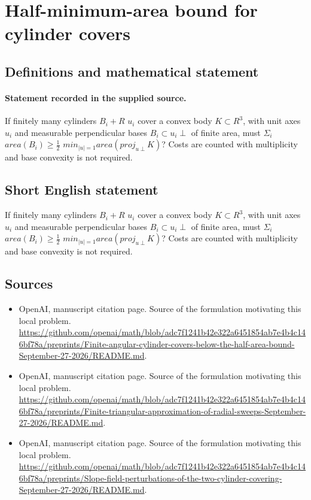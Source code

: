 \documentclass[11pt]{article}
\begin{document}
\section*{Half-minimum-area bound for cylinder covers}\label{30007110}
\subsection{Definitions and mathematical statement}
\paragraph{Statement recorded in the supplied source.}
If finitely many cylinders $B_i+R$ $u_i$ cover a convex body $K\subset R^{3}$, with unit axes $u_i$ and measurable perpendicular bases $B_i\subset u_i\perp $ of finite area, must $\Sigma _i$ $area(B_i)\geq \tfrac12 $ $min_{|u|=1}area(proj_{u\perp }K)$? Costs are counted with multiplicity and base convexity is not required.
\subsection{Short English statement}
If finitely many cylinders $B_i+R$ $u_i$ cover a convex body $K\subset R^{3}$, with unit axes $u_i$ and measurable perpendicular bases $B_i\subset u_i\perp $ of finite area, must $\Sigma _i$ $area(B_i)\geq \tfrac12 $ $min_{|u|=1}area(proj_{u\perp }K)$? Costs are counted with multiplicity and base convexity is not required.
\subsection{Sources}
\begin{itemize}
\item[S1] OpenAI, manuscript citation page. Source of the formulation motivating this local problem.
\url{https://github.com/openai/math/blob/adc7f1241b42e322a6451854ab7e4b4c146bf78a/preprints/Finite-angular-cylinder-covers-below-the-half-area-bound-September-27-2026/README.md}.
\item[S2] OpenAI, manuscript citation page. Source of the formulation motivating this local problem.
\url{https://github.com/openai/math/blob/adc7f1241b42e322a6451854ab7e4b4c146bf78a/preprints/Finite-triangular-approximation-of-radial-sweeps-September-27-2026/README.md}.
\item[S3] OpenAI, manuscript citation page. Source of the formulation motivating this local problem.
\url{https://github.com/openai/math/blob/adc7f1241b42e322a6451854ab7e4b4c146bf78a/preprints/Slope-field-perturbations-of-the-two-cylinder-covering-September-27-2026/README.md}.
\end{itemize}
\end{document}
